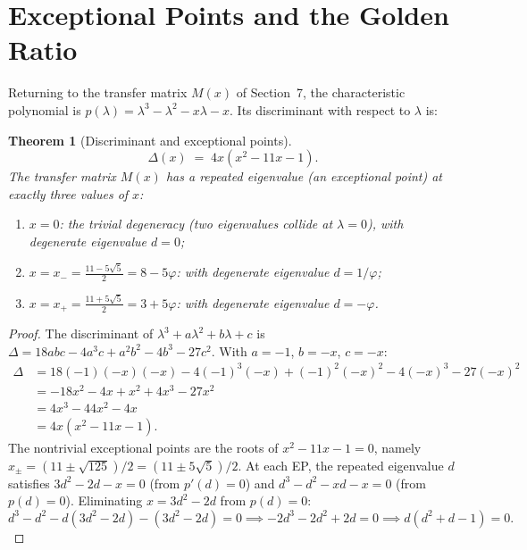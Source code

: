 \documentclass[11pt]{amsart}
\newtheorem{theorem}{Theorem}[section]
\theoremstyle{definition}
\begin{document}
\section{Exceptional Points and the Golden Ratio}

Returning to the transfer matrix $M(x)$ of Section~7, the characteristic polynomial is $p(\lambda) = \lambda^3 - \lambda^2 - x\lambda - x$. Its discriminant with respect to $\lambda$ is:

\begin{theorem}[Discriminant and exceptional points]\label{thm:disc}
\[
\Delta(x) \;=\; 4x(x^2 - 11x - 1).
\]
The transfer matrix $M(x)$ has a repeated eigenvalue (an \emph{exceptional point}) at exactly three values of $x$:
\begin{enumerate}
\item $x = 0$: the trivial degeneracy (two eigenvalues collide at $\lambda = 0$), with degenerate eigenvalue $d = 0$;
\item $x = x_- = \frac{11 - 5\sqrt{5}}{2} = 8 - 5\varphi$: with degenerate eigenvalue $d = 1/\varphi$;
\item $x = x_+ = \frac{11 + 5\sqrt{5}}{2} = 3 + 5\varphi$: with degenerate eigenvalue $d = -\varphi$.
\end{enumerate}
\end{theorem}

\begin{proof}
The discriminant of $\lambda^3 + a\lambda^2 + b\lambda + c$ is $\Delta = 18abc - 4a^3c + a^2b^2 - 4b^3 - 27c^2$. With $a = -1$, $b = -x$, $c = -x$:
\begin{align*}
\Delta &= 18(-1)(-x)(-x) - 4(-1)^3(-x) + (-1)^2(-x)^2 - 4(-x)^3 - 27(-x)^2 \\
       &= -18x^2 - 4x + x^2 + 4x^3 - 27x^2 \\
       &= 4x^3 - 44x^2 - 4x \\
       &= 4x(x^2 - 11x - 1).
\end{align*}
The nontrivial exceptional points are the roots of $x^2 - 11x - 1 = 0$, namely $x_\pm = (11 \pm \sqrt{125})/2 = (11 \pm 5\sqrt{5})/2$. At each EP, the repeated eigenvalue $d$ satisfies $3d^2 - 2d - x = 0$ (from $p'(d) = 0$) and $d^3 - d^2 - xd - x = 0$ (from $p(d) = 0$). Eliminating $x = 3d^2 - 2d$ from $p(d) = 0$:
\[
d^3 - d^2 - d(3d^2 - 2d) - (3d^2 - 2d) = 0 \implies -2d^3 - 2d^2 + 2d = 0 \implies d(d^2 + d - 1) = 0.
\]
\end{proof}
\end{document}
